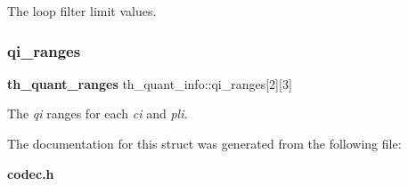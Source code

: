 The loop filter limit values. 

\mbox{\label{structth__quant__info_a6feacf4b365e305a7df7b93d87ee7bb8}} 
\subsubsection{qi\+\_\+ranges}
{\footnotesize\ttfamily \textbf{ th\+\_\+quant\+\_\+ranges} th\+\_\+quant\+\_\+info\+::qi\+\_\+ranges[2][3]}



The {\itshape qi} ranges for each {\itshape ci} and {\itshape pli}. 



The documentation for this struct was generated from the following file\+:\begin{DoxyCompactItemize}
\item 
\textbf{ codec.\+h}\end{DoxyCompactItemize}
